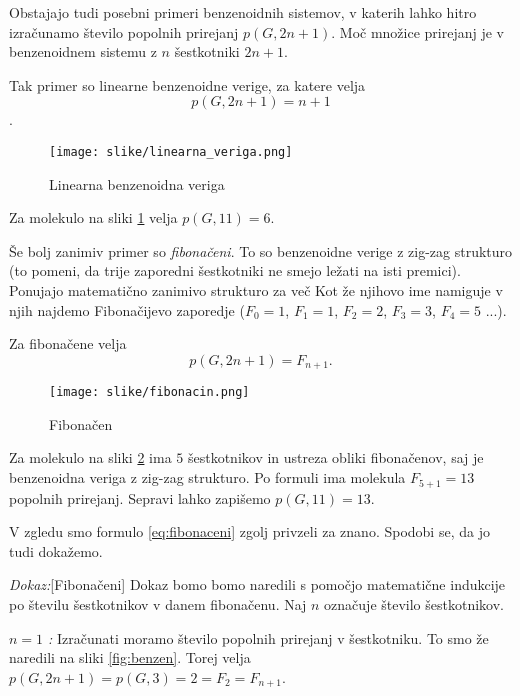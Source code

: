 \documentclass[mat1, tisk]{fmfdelo}
\begin{document}
Obstajajo tudi posebni primeri benzenoidnih sistemov, 
v katerih lahko hitro izračunamo število popolnih prirejanj $p(G, 2n+1)$.
Moč množice prirejanj je v benzenoidnem sistemu z $n$ šestkotniki $2n+1$.

\begin{zgled}
  Tak primer so linearne benzenoidne verige, 
  za katere velja 
  $$p(G, 2n + 1) = n + 1$$.
  \begin{figure}[H]
    \centering
    \texttt{[image: slike/linearna\_veriga.png]}
    \caption{ Linearna benzenoidna veriga}
    \label{fig:linearna_veriga}
  \end{figure}
  Za molekulo na sliki \ref{fig:linearna_veriga}
  velja $
  p(G, 11) = 6
  $.
\end{zgled}




\begin{zgled}
  Še bolj zanimiv primer so \emph{fibonačeni}.
  To so benzenoidne verige z zig-zag strukturo 
  (to pomeni, da trije zaporedni šestkotniki ne smejo ležati na isti premici).
  Ponujajo matematično zanimivo strukturo za več %
  Kot že njihovo ime namiguje v njih najdemo Fibonačijevo zaporedje
  ($F_0 = 1$, $F_1 = 1$, $F_2 = 2$, $F_3 = 3$, $F_4 = 5$ ...). 
  
  Za fibonačene velja 
  \begin{equation}
    p(G ,2n+1) = F_{n+1}.
    \label{eq:fibonaceni}
  \end{equation}
  
  \begin{figure}[H]
    \centering
    \texttt{[image: slike/fibonacin.png]}
    \caption{Fibonačen}
    \label{fig:fibonaceni}
  \end{figure}
  Za molekulo na sliki \ref{fig:fibonaceni}
  ima $5$ šestkotnikov in ustreza obliki fibonačenov, saj je benzenoidna veriga
  z zig-zag strukturo. Po formuli ima molekula $F_{5+1} = 13$ popolnih prirejanj.
  Sepravi lahko zapišemo
  $
  p(G, 11) = 13
  $.
\end{zgled}

V zgledu smo formulo \ref{eq:fibonaceni} zgolj privzeli za znano.
Spodobi se, da jo tudi dokažemo.

\noindent
{\em Dokaz:\/}[Fibonačeni]
Dokaz bomo bomo naredili s pomočjo matematične indukcije po številu šestkotnikov v danem
fibonačenu. Naj $n$ označuje število šestkotnikov.

\emph{ $n = 1$ :} Izračunati moramo število popolnih prirejanj v šestkotniku. 
To smo že naredili na sliki \ref{fig:benzen}. Torej velja 
$p(G,2n+1) = p(G,3) = 2 = F_{2} = F_{n+1}$.
\end{document}
